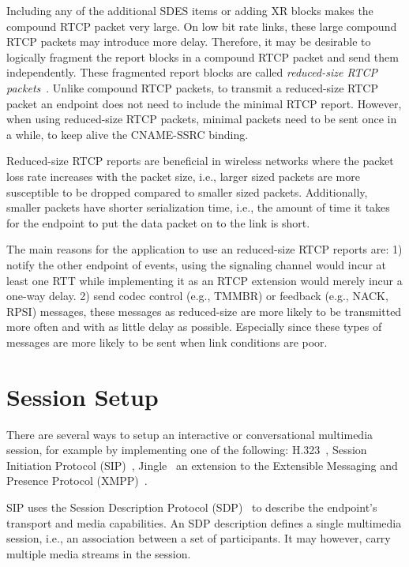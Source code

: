 Including any of the additional SDES items or adding XR blocks makes the
compound RTCP packet very large. On low bit rate links, these large compound
RTCP packets may introduce more delay. Therefore, it may be desirable to
logically fragment the report blocks in a compound RTCP packet and send them
independently. These fragmented report blocks are called \emph {reduced-size
RTCP packets}~\cite{rfc5506}. Unlike compound RTCP packets, to transmit a
reduced-size RTCP packet an endpoint does not need to include the minimal RTCP
report. However, when using reduced-size RTCP packets, minimal packets need to
be sent once in a while, to keep alive the CNAME-SSRC binding.

Reduced-size RTCP reports are beneficial in wireless networks where the packet
loss rate increases with the packet size, i.e., larger sized packets are more
susceptible to be dropped compared to smaller sized packets. Additionally, smaller
packets have shorter serialization time, i.e., the amount of time it takes for
the endpoint to put the data packet on to the link is short.

The main reasons for the application to use an reduced-size RTCP reports are:
1) notify the other endpoint of events, using the signaling channel would
incur at least one RTT while implementing it as an RTCP extension would merely
incur a one-way delay. 2) send codec control (e.g., TMMBR) or feedback (e.g.,
NACK, RPSI) messages, these messages as reduced-size are more likely to be
transmitted more often and with as little delay as possible. Especially since
these types of messages are more likely to be sent when link conditions are
poor.


\section{Session Setup}


There are several ways to setup an interactive or conversational multimedia
session, for example by implementing one of the following: H.323~\cite{H.323},
Session Initiation Protocol (SIP)~\cite{rfc3261}, Jingle~\cite{XEP-0166} an
extension to the Extensible Messaging and Presence Protocol
(XMPP)~\cite{rfc6120}.

SIP uses the Session Description Protocol (SDP)~\cite{rfc4566} to describe the
endpoint's transport and media capabilities. An SDP description defines a
single multimedia session, i.e., an association between a set of participants.
It may however, carry multiple media streams in the session.

